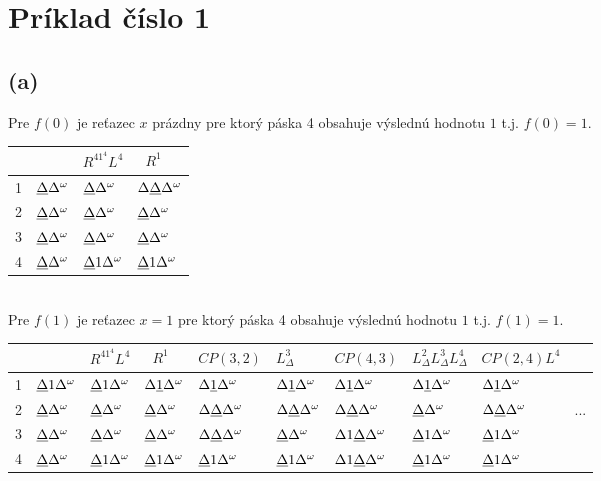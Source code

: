 \documentclass[11pt,a4paper]{article}
\newcommand{\D}{\Delta}
\newcommand{\EOT}{\Delta^\omega} %
\newcommand{\UL}[1]{\underbar{$#1$}} %
\begin{document}
\newpage
\section{Príklad číslo 1}

\subsection{(a)}

Pre $f(0)$ je reťazec $x$ prázdny pre ktorý páska 4 obsahuje výslednú hodnotu $1$ t.j. $f(0)=1$.\\[-0.5em]

\begin{tabular}{r|l|l|l}
    &                    & \tiny{$R^41^4L^4$}   & \tiny{$R^1$} \\\hline
  1 & $\UL{\D} \EOT$ & $\UL{\D} \EOT$   & $\D \UL{\D} \EOT$    \\
  2 & $\UL{\D} \EOT$ & $\UL{\D} \EOT$   & $\UL{\D} \EOT$       \\
  3 & $\UL{\D} \EOT$ & $\UL{\D} \EOT$   & $\UL{\D} \EOT$       \\
  4 & $\UL{\D} \EOT$ & $\UL{\D} 1 \EOT$ & $\UL{\D} 1 \EOT$     \\
\end{tabular}

\hfill\\[-1em]

Pre $f(1)$ je reťazec $x = 1$ pre ktorý páska 4 obsahuje výslednú hodnotu $1$ t.j. $f(1)=1$.\\[-0.5em]

\begin{tabular}{r|l|l|l|l|l|l|l|l|l}
    &                  &\tiny{$R^41^4L^4$}& \tiny{$R^1$}     & \tiny{$CP(3,2)$}  & \tiny{$L^3_\D$}   & \tiny{$CP(4,3)$}    &\tiny{$L^2_\D L^3_\D L^4_\D$}& \tiny{$CP(2,4)L^4$} & \\\hline
  1 & $\UL{\D} 1 \EOT$ & $\UL{\D} 1 \EOT$ & $\D \UL{1} \EOT$ & $\D \UL{1} \EOT$  & $\D \UL{1} \EOT$  & $\D \UL{1} \EOT$    & $\D \UL{1} \EOT$            & $\D \UL{1} \EOT$    & \\
  2 & $\UL{\D} \EOT$   & $\UL{\D} \EOT$   & $\UL{\D} \EOT$   & $\D \UL{\D} \EOT$ & $\D \UL{\D} \EOT$ & $\D \UL{\D} \EOT$   & $\UL{\D} \EOT$              & $\D \UL{\D} \EOT$   & ... \\
  3 & $\UL{\D} \EOT$   & $\UL{\D} \EOT$   & $\UL{\D} \EOT$   & $\D \UL{\D} \EOT$ & $\UL{\D} \EOT$    & $\D 1 \UL{\D} \EOT$ & $\UL{\D} 1 \EOT$            & $\UL{\D} 1 \EOT$    & \\
  4 & $\UL{\D} \EOT$   & $\UL{\D} 1 \EOT$ & $\UL{\D} 1 \EOT$ & $\UL{\D} 1 \EOT$  & $\UL{\D} 1 \EOT$  & $\D 1 \UL{\D} \EOT$ & $\UL{\D} 1 \EOT$            & $\UL{\D} 1 \EOT$    & \\
\end{tabular}
\end{document}
